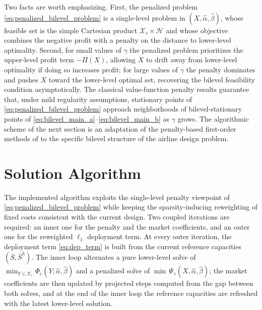 Two facts are worth emphasizing. First, the penalized problem \eqref{eq:penalized_bilevel_problem} is a single-level problem in $(X,\widehat{\alpha},\widehat{\beta})$, whose feasible set is the simple Cartesian product $\mathcal{X}_c\times\mathcal{H}$ and whose objective combines the negative profit with a penalty on the distance to lower-level optimality. Second, for small values of $\gamma$ the penalized problem prioritizes the upper-level profit term $-\Pi(X)$, allowing $X$ to drift away from lower-level optimality if doing so increases profit; for large values of $\gamma$ the penalty dominates and pushes $X$ toward the lower-level optimal set, recovering the bilevel feasibility condition asymptotically. The classical value-function penalty results \cite{Ye1997Exact,LuMei2024} guarantee that, under mild regularity assumptions, stationary points of \eqref{eq:penalized_bilevel_problem} approach neighborhoods of bilevel-stationary points of \eqref{eq:bilevel_main_a}--\eqref{eq:bilevel_main_b} as $\gamma$ grows. The algorithmic scheme of the next section is an adaptation of the penalty-based first-order methods of \cite{Jiang2024Primal} to the specific bilevel structure of the airline design problem.

\section{Solution Algorithm}
\label{sec:solution_algorithm}
The implemented algorithm exploits the single-level penalty viewpoint of \eqref{eq:penalized_bilevel_problem} while keeping the sparsity-inducing reweighting of fixed costs consistent with the current design. Two coupled iterations are required: an inner one for the penalty and the market coefficients, and an outer one for the reweighted $\ell_1$ deployment term. At every outer iteration, the deployment term \eqref{eq:dep_term} is built from the current reference capacities $(\bar S,\bar S^h)$. The inner loop alternates a pure lower-level solve of $\min_{Y\in\mathcal{X}_c}\Phi_{\mathrm{c}}(Y;\widehat{\alpha},\widehat{\beta})$ and a penalized solve of $\min\,\Psi_\gamma(X,\widehat{\alpha},\widehat{\beta})$; the market coefficients are then updated by projected steps computed from the gap between both solves, and at the end of the inner loop the reference capacities are refreshed with the latest lower-level solution.

